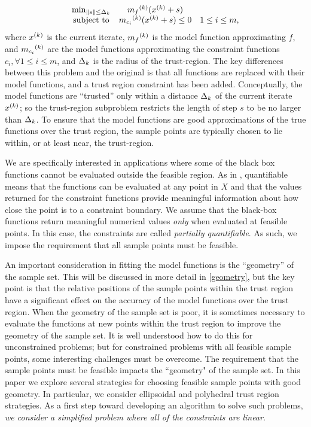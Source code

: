 \[ \begin{array}{ccl} \min_{\| s \| \le \Delta_k}
 & {{m}_f}^{(k)} ({x^{(k)}}+s) \\
\mbox{subject to} & {{m}_{c_i}}^{(k)}({x^{(k)}} + s) \le 0 & 1 \le i \le m,
\end{array}
\]
where ${x^{(k)}}$ is the current iterate, ${{m}_f}^{(k)}$ is the model function approximating $f$,  and ${{m}_{c_i}}^{(k)}$ are the model functions approximating the constraint functions $c_i, \forall 1 \le i \le m$, and $\Delta_k$ is the radius of the trust-region.
The key differences between this problem and the original is that all functions are replaced with their model functions, and a trust region constraint has been added.
Conceptually, the model functions are ``trusted'' only within a distance $ \Delta_k $ of the current iterate ${x^{(k)}}$; so the trust-region subproblem restricts the length of step $s$ to be no larger than $\Delta_k$.
To ensure that the model functions are good approximations of the true functions over the trust region, the sample points are typically chosen to lie within, or at least near, the trust-region.


We are specifically interested in applications where some of the black box functions cannot be evaluated outside the feasible region.
As in \cite{DUMMY:typesofconstraints}, quantifiable means that the functions can be evaluated at any point in $X$ and that the values returned for the constraint functions provide meaningful information about how close the point is to a constraint boundary.
We assume that the black-box functions return meaningful numerical values \emph{only} when evaluated at feasible points.
In this case, the constraints are called {\em partially quantifiable}.   
As such, we impose the requirement that all sample points must be feasible.

An important consideration in fitting the model functions is the ``geometry'' of the sample set.
This will be discussed in more detail in \cref{geometry}, but the key point is that the relative positions of the sample points within the trust region have a significant effect on the accuracy of the model functions over the trust region.
When the geometry of the sample set is poor, it is sometimes necessary to evaluate the functions at new points within the trust region to improve the geometry of the sample set.
It is well understood how to do this for unconstrained problems; but for constrained problems with all feasible sample points, some interesting challenges must be overcome.
The requirement that the sample points must be feasible impacts the ``geometry" of the sample set.
In this paper we explore several strategies for choosing feasible sample points with good geometry.
In particular, we consider ellipsoidal and polyhedral trust region strategies.
As a first step toward developing an algorithm to solve such problems, \emph{we consider a simplified problem where all of the constraints are linear}.

